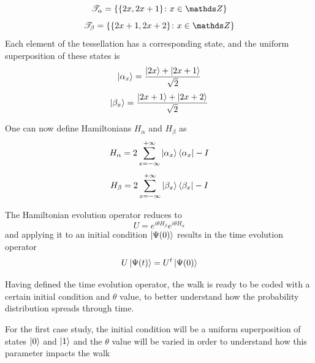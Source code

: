 \documentclass[../../dissertation.tex]{subfiles}
\begin{document}
\begin{equation}
	\mathscr{T}_{\alpha}= \{\{2x,2x+1\}\colon x \in \Z\}
\end{equation}
\begin{equation}
	\mathscr{T}_{\beta}= \{\{2x+1,2x+2\}\colon x \in \Z\}
\end{equation}
Each element of the tessellation has a corresponding state, and the uniform superposition of these states is
\begin{equation}
	\ket{\alpha_x} = \frac{\ket{2x} + \ket{2x+1}}{\sqrt{2}}
\end{equation}
\begin{equation}
	\ket{\beta_x} = \frac{\ket{2x+1}+\ket{2x+2}}{\sqrt{2}}
\end{equation}\par
One can now define Hamiltonians $H_\alpha$ and $H_\beta$ as 
\begin{equation}
	H_\alpha = 2\sum_{x=-\infty}^{+\infty}\ket{\alpha_{x}}\bra{\alpha_x} - I
\end{equation}
\begin{equation}
	H_\beta = 2\sum_{x=-\infty}^{+\infty}\ket{\beta_{x}}\bra{\beta_x} - I
\end{equation}\par
The Hamiltonian evolution operator reduces to
\begin{equation}
	U = e^{i\theta H_\beta}e^{i\theta H_\alpha}
\end{equation}
and applying it to an initial condition $\ket{\Psi(0)}$ results in the time evolution operator
\begin{equation}
	U\ket{\Psi(t)} = U^t\ket{\Psi(0)}
\end{equation}\par
Having defined the time evolution operator, the walk is ready to be coded with a certain initial condition and $\theta$ value, to better understand how the probability distribution spreads through time. 

For the first case study, the initial condition will be a uniform superposition of states $\ket{0}$ and $\ket{1}$ and the $\theta$ value will be varied in order to understand how this parameter impacts the walk
\end{document}
